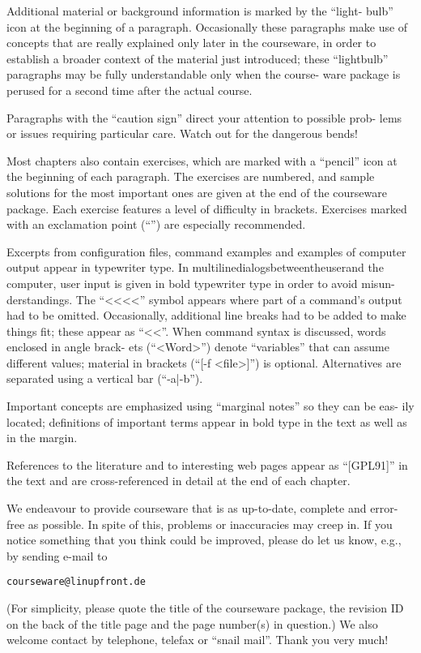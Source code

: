 Additional material or background information is marked by the “light- bulb” icon at the beginning of a paragraph. Occasionally these paragraphs make use of concepts that are really explained only later in the courseware, in order to establish a broader context of the material just introduced; these “lightbulb” paragraphs may be fully understandable only when the course- ware package is perused for a second time after the actual course.

Paragraphs with the “caution sign” direct your attention to possible prob- lems or issues requiring particular care. Watch out for the dangerous bends!

Most chapters also contain exercises, which are marked with a “pencil” icon at the beginning of each paragraph. The exercises are numbered, and sample solutions for the most important ones are given at the end of the courseware package. Each exercise features a level of difficulty in brackets. Exercises marked with an exclamation point (“\!”) are especially recommended.

Excerpts from configuration files, command examples and examples of computer output appear in typewriter type. In multilinedialogsbetweentheuserand the computer, user input is given in bold typewriter type in order to avoid misun- derstandings. The “<<<<” symbol appears where part of a command’s output had to be omitted. Occasionally, additional line breaks had to be added to make things fit; these appear as “<<”. When command syntax is discussed, words enclosed in angle brack- ets (“<Word>”) denote “variables” that can assume different values; material in brackets (“[-f <file>]”) is optional. Alternatives are separated using a vertical bar (“-a|-b”).

Important concepts are emphasized using “marginal notes” so they can be eas- ily located; definitions of important terms appear in bold type in the text as well as in the margin.

References to the literature and to interesting web pages appear as “[GPL91]” in the text and are cross-referenced in detail at the end of each chapter.

We endeavour to provide courseware that is as up-to-date, complete and error- free as possible. In spite of this, problems or inaccuracies may creep in. If you notice something that you think could be improved, please do let us know, e.g., by sending e-mail to
\begin{verbatim}
courseware@linupfront.de
\end{verbatim}
(For simplicity, please quote the title of the courseware package, the revision ID on the back of the title page and the page number(s) in question.) We also welcome contact by telephone, telefax or “snail mail”. Thank you very much!
